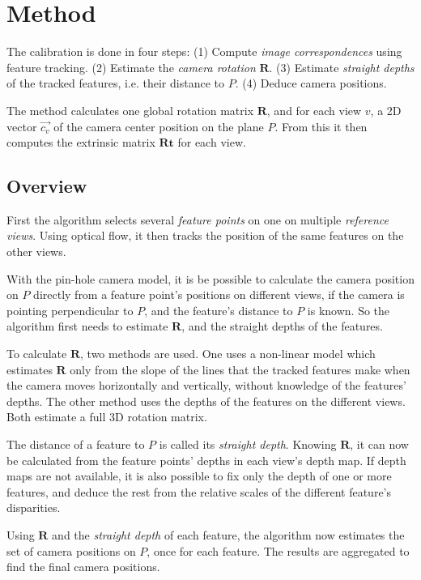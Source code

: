 \documentclass{scrreprt}
\newcommand{\matr}[1]{\mathbf{#1}}
\begin{document}
\chapter{Method}
The calibration is done in four steps: (1) Compute \emph{image correspondences} using feature tracking. (2) Estimate the \emph{camera rotation} $\matr{R}$. (3) Estimate \emph{straight depths} of the tracked features, i.e. their distance to $P$. (4) Deduce camera positions.

The method calculates one global rotation matrix $\matr{R}$, and for each view $v$, a 2D vector $\vec{c_v}$ of the camera center position on the plane $P$. From this it then computes the extrinsic matrix $\matr{Rt}$ for each view.

\section{Overview}
First the algorithm selects several \emph{feature points} on one on multiple \emph{reference views}. Using optical flow, it then tracks the position of the same features on the other views.

With the pin-hole camera model, it is be possible to calculate the camera position on $P$ directly from a feature point's positions on different views, if the camera is pointing perpendicular to $P$, and the feature's distance to $P$ is known. So the algorithm first needs to estimate $\matr{R}$, and the straight depths of the features.

To calculate $\matr{R}$, two methods are used. One uses a non-linear model which estimates $\matr{R}$ only from the slope of the lines that the tracked features make when the camera moves horizontally and vertically, without knowledge of the features' depths. The other method uses the depths of the features on the different views. Both estimate a full 3D rotation matrix.

The distance of a feature to $P$ is called its \emph{straight depth}. Knowing $\matr{R}$, it can now be calculated from the feature points' depths in each view's depth map. If depth maps are not available, it is also possible to fix only the depth of one or more features, and deduce the rest from the relative scales of the different feature's disparities. 

Using $\matr{R}$ and the \emph{straight depth} of each feature, the algorithm now estimates the set of camera positions on $P$, once for each feature. The results are aggregated to find the final camera positions.
\end{document}
